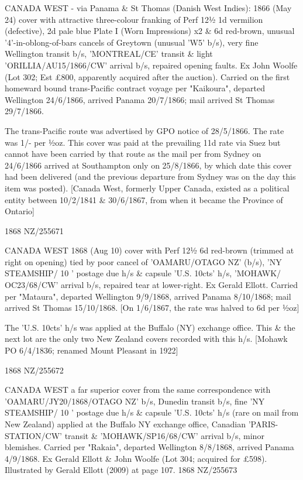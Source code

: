 \documentclass[justified]{tufte-book}
\begin{document}
{CANADA WEST - via Panama \& St Thomas (Danish West Indies): 1866 (May 24) cover with attractive three-colour franking of Perf 12½ 1d vermilion (defective), 2d pale blue Plate I (Worn Impressions) x2 \& 6d red-brown, unusual '4'-in-oblong-of-bars cancels of Greytown (unusual 'W5' b/s), very fine Wellington transit b/s, 'MONTREAL/CE' transit \& light 'ORILLIA/AU15/1866/CW' arrival b/s, repaired opening faults. Ex John Woolfe (Lot 302; Est £800, apparently acquired after the auction). Carried on the first homeward bound trans-Pacific contract voyage per "Kaikoura", departed Wellington 24/6/1866, arrived Panama 20/7/1866; mail arrived St Thomas 29/7/1866.

The trans-Pacific route was advertised by GPO notice of 28/5/1866. The rate was 1/- per ½oz. This cover was paid at the prevailing 11d rate via Suez but cannot have been carried by that route as the mail per  from Sydney on 24/6/1866 arrived at Southampton only on 25/8/1866, by which date this cover had been delivered (and the previous departure from Sydney was on the day this item was posted). [Canada West, formerly Upper Canada, existed as a political entity between 10/2/1841 \& 30/6/1867, from when it became the Province of Ontario]}%
{1868}%
{NZ/255671}%
{}%
{}
{}%
{}

%
{CANADA WEST 1868 (Aug 10) cover with Perf 12½ 6d red-brown (trimmed at right on opening) tied by poor cancel of 'OAMARU/OTAGO NZ' (b/s), 'NY STEAMSHIP/ 10 ' postage due h/s \& capsule 'U.S. 10cts' h/s, 'MOHAWK/ OC23/68/CW' arrival b/s, repaired tear at lower-right. Ex Gerald Ellott. Carried per "Mataura", departed Wellington 9/9/1868, arrived Panama 8/10/1868; mail arrived St Thomas 15/10/1868. [On 1/6/1867, the rate was halved to 6d per ½oz] 

The 'U.S. 10cts' h/s was applied at the Buffalo (NY) exchange office. This \& the next lot are the only two New Zealand covers recorded with this h/s. [Mohawk PO 6/4/1836; renamed Mount Pleasant in 1922]}%
{1868}%
{NZ/255672}%
{}%
{}
{}%
{}

%
{CANADA WEST a far superior cover from the same correspondence with 'OAMARU/JY20/1868/OTAGO NZ' b/s, Dunedin transit b/s, fine 'NY STEAMSHIP/ 10 ' postage due h/s \& capsule 'U.S. 10cts' h/s (rare on mail from New Zealand) applied at the Buffalo NY exchange office, Canadian 'PARIS-STATION/CW' transit \& 'MOHAWK/SP16/68/CW' arrival b/s, minor blemishes. Carried per "Rakaia", departed Wellington 8/8/1868, arrived Panama 4/9/1868. Ex Gerald Ellott \& John Woolfe (Lot 304; acquired for £598). Illustrated by Gerald Ellott (2009) at page 107.}%
{1868}%
{NZ/255673}%
{}%
{}
{}%
{}
\end{document}
